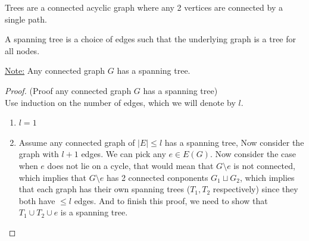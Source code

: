 \documentclass[12pt]{article}
\begin{document}
\begin{tcolorbox}[title=Definition:Trees]
	Trees are a connected acyclic graph where any 2 vertices are connected by a single path.
\end{tcolorbox}

\begin{tcolorbox}[title=Definition: Spanning Tree]
	A spanning tree is a choice of edges such that the underlying graph is a tree for all nodes.
\end{tcolorbox}

\underline{Note:} Any connected graph $G$ has a spanning tree.

\begin{proof}
	(Proof any connected graph $G$ has a spanning tree)\\
	Use induction on the number of edges, which we will denote by $l$.
	\begin{enumerate}
		\item{$l=1$}
		\item{Assume any connected graph of  $|E|\leq l$  has a spanning tree, Now consider the graph with $l+1$ edges. We can pick any $e\in E(G)$. Now consider the case when $e$ does not lie on a cycle, that would mean that $G \setminus e$ is not connected, which implies that $G \setminus e$ has 2 connected conponents $G_1 \sqcup G_2$, which implies that each graph has their own spanning trees ($T_1, T_2$ respectively) since they both have  $\leq l$ edges. And to finish this proof, we need to show that $T_1 \cup T_2 \cup e $ is a spanning tree.}
	\end{enumerate}
\end{proof}
\end{document}

